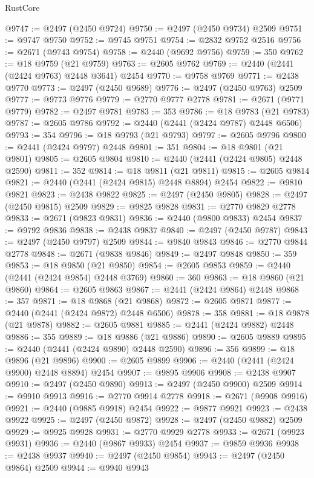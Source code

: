 \begin{lexlean}{RustCore}
\begin{coremodule}
@9747 := @2497 (@2450 @9724)
@9750 := @2497 (@2450 @9734) @2509
@9751 := @9747 @9750
@9752 := @9745 @9751
@9754 := @2832 @9752 @2516
@9756 := @2671 (@9743 @9754)
@9758 := @2440 (@9692 @9756)
@9759 := 350
@9762 := @18 @9759 (@21 @9759)
@9763 := @2605 @9762
@9769 := @2440 (@2441 (@2424 @9763) @2448 @3641) @2454
@9770 := @9758 @9769
@9771 := @2438 @9770
@9773 := @2497 (@2450 @9689)
@9776 := @2497 (@2450 @9763) @2509
@9777 := @9773 @9776
@9779 := @2770 @9777 @2778
@9781 := @2671 (@9771 @9779)
@9782 := @2497 @9781
@9783 := 353
@9786 := @18 @9783 (@21 @9783)
@9787 := @2605 @9786
@9792 := @2440 (@2441 (@2424 @9787) @2448 @6506)
@9793 := 354
@9796 := @18 @9793 (@21 @9793)
@9797 := @2605 @9796
@9800 := @2441 (@2424 @9797) @2448
@9801 := 351
@9804 := @18 @9801 (@21 @9801)
@9805 := @2605 @9804
@9810 := @2440 (@2441 (@2424 @9805) @2448 @2590)
@9811 := 352
@9814 := @18 @9811 (@21 @9811)
@9815 := @2605 @9814
@9821 := @2440 (@2441 (@2424 @9815) @2448 @8894) @2454
@9822 := @9810 @9821
@9823 := @2438 @9822
@9825 := @2497 (@2450 @9805)
@9828 := @2497 (@2450 @9815) @2509
@9829 := @9825 @9828
@9831 := @2770 @9829 @2778
@9833 := @2671 (@9823 @9831)
@9836 := @2440 (@9800 @9833) @2454
@9837 := @9792 @9836
@9838 := @2438 @9837
@9840 := @2497 (@2450 @9787)
@9843 := @2497 (@2450 @9797) @2509
@9844 := @9840 @9843
@9846 := @2770 @9844 @2778
@9848 := @2671 (@9838 @9846)
@9849 := @2497 @9848
@9850 := 359
@9853 := @18 @9850 (@21 @9850)
@9854 := @2605 @9853
@9859 := @2440 (@2441 (@2424 @9854) @2448 @3769)
@9860 := 360
@9863 := @18 @9860 (@21 @9860)
@9864 := @2605 @9863
@9867 := @2441 (@2424 @9864) @2448
@9868 := 357
@9871 := @18 @9868 (@21 @9868)
@9872 := @2605 @9871
@9877 := @2440 (@2441 (@2424 @9872) @2448 @6506)
@9878 := 358
@9881 := @18 @9878 (@21 @9878)
@9882 := @2605 @9881
@9885 := @2441 (@2424 @9882) @2448
@9886 := 355
@9889 := @18 @9886 (@21 @9886)
@9890 := @2605 @9889
@9895 := @2440 (@2441 (@2424 @9890) @2448 @2590)
@9896 := 356
@9899 := @18 @9896 (@21 @9896)
@9900 := @2605 @9899
@9906 := @2440 (@2441 (@2424 @9900) @2448 @8894) @2454
@9907 := @9895 @9906
@9908 := @2438 @9907
@9910 := @2497 (@2450 @9890)
@9913 := @2497 (@2450 @9900) @2509
@9914 := @9910 @9913
@9916 := @2770 @9914 @2778
@9918 := @2671 (@9908 @9916)
@9921 := @2440 (@9885 @9918) @2454
@9922 := @9877 @9921
@9923 := @2438 @9922
@9925 := @2497 (@2450 @9872)
@9928 := @2497 (@2450 @9882) @2509
@9929 := @9925 @9928
@9931 := @2770 @9929 @2778
@9933 := @2671 (@9923 @9931)
@9936 := @2440 (@9867 @9933) @2454
@9937 := @9859 @9936
@9938 := @2438 @9937
@9940 := @2497 (@2450 @9854)
@9943 := @2497 (@2450 @9864) @2509
@9944 := @9940 @9943

\end{coremodule}
\end{lexlean}
